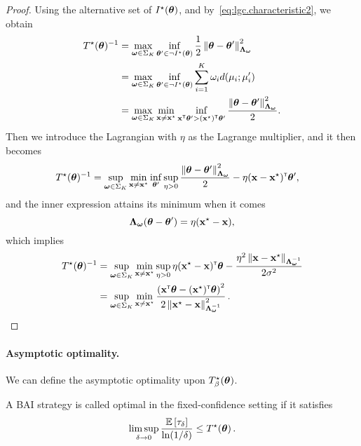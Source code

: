 \begin{proof}
Using the alternative set of $I^\star({\boldsymbol \theta})$, and by~\eqref{eq:lgc.characteristic2}, we obtain
\begin{align*}
    T^\star({\boldsymbol \theta})^{-1} &= \max_{{\boldsymbol \omega} \in \Sigma_K} \inf_{{\boldsymbol \theta}'\in \neg I^\star({\boldsymbol \theta})} \frac{1}{2}\left\lVert{\boldsymbol \theta} - {\boldsymbol \theta}'\right\rVert_{{\boldsymbol \Lambda}_{{\boldsymbol \omega}}}^2\\
    &= \max_{{\boldsymbol \omega}\in\Sigma_K}\inf_{{\boldsymbol \theta}'\in\neg I^\star({\boldsymbol \theta})}\sum_{i=1}^K \omega_i d(\mu_i;\mu_i')\\
    &= \max_{{\boldsymbol \omega}\in\Sigma_K}\min_{{\bf x}\neq{\bf x}^\star}\inf_{{\bf x}^\mathsf{\scriptscriptstyle T}{\boldsymbol \theta}'>({\bf x}^\star)^\mathsf{\scriptscriptstyle T}{\boldsymbol \theta}'} \frac{\left\lVert{\boldsymbol \theta}-{\boldsymbol \theta}'\right\rVert_{{\boldsymbol \Lambda}_{{\boldsymbol \omega}}}^2}{2}.
\end{align*}
Then we introduce the Lagrangian with $\eta$ as the Lagrange multiplier, and it then becomes
\begin{align*}
    T^\star({\boldsymbol \theta})^{-1} &= \sup_{{\boldsymbol \omega}\in\Sigma_K}\min_{{\bf x}\neq{\bf x}^\star}\inf_{{\boldsymbol \theta}'}\sup_{\eta>0} \frac{\left\lVert{\boldsymbol \theta}-{\boldsymbol \theta}'\right\rVert_{{\boldsymbol \Lambda}_{{\boldsymbol \omega}}}^2}{2} - \eta({\bf x}-{\bf x}^\star)^\mathsf{\scriptscriptstyle T}{\boldsymbol \theta}',
\end{align*}
and the inner expression attains its minimum when it comes
\[
    {\boldsymbol \Lambda}_{{\boldsymbol \omega}}({\boldsymbol \theta}-{\boldsymbol \theta}') = \eta({\bf x}^\star-{\bf x}),
\]
which implies
\begin{align*}
    T^\star({\boldsymbol \theta})^{-1} &=
    \sup_{{\boldsymbol \omega}\in\Sigma_K}\min_{{\bf x}\neq{\bf x}^\star}\sup_{\eta>0} \eta({\bf x}^\star-{\bf x})^\mathsf{\scriptscriptstyle T}{\boldsymbol \theta} - \frac{\eta^2\left\lVert{\bf x}-{\bf x}^\star\right\rVert_{{\boldsymbol \Lambda}_{{\boldsymbol \omega}}^{-1}}}{2\sigma^2}\\
    &= \sup_{{\boldsymbol \omega}\in\Sigma_K}\min_{{\bf x}\neq{\bf x}^\star}\frac{\left({\bf x}^\mathsf{\scriptscriptstyle T}{\boldsymbol \theta}-({\bf x}^\star)^\mathsf{\scriptscriptstyle T}{\boldsymbol \theta}\right)^2}{2\left\lVert{\bf x}^\star - {\bf x}\right\rVert^2_{{\boldsymbol \Lambda}_{{\boldsymbol \omega}}^{-1}}}\,.
\end{align*}
\end{proof}

\paragraph{Asymptotic optimality.}
We can define the asymptotic optimality upon $T^\star_\beta({\boldsymbol \theta})$. 

\begin{definition}\label{def:lgc.optimality}
\begin{leftbar}[defnbar]
A BAI strategy is called optimal in the fixed-confidence setting if it satisfies
\[
    \limsup_{\delta \rightarrow 0}\frac{\mathbb{E}\left[\tau_\delta\right]}{\ln(1/\delta)} \leq T^\star({\boldsymbol \theta})\,.
\]
\end{leftbar}
\end{definition}

